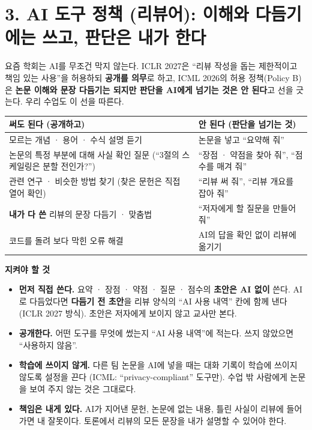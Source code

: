 \documentclass[11pt]{article}
\begin{document}
\section*{3. AI 도구 정책 (리뷰어): 이해와 다듬기에는 쓰고, 판단은 내가 한다}
요즘 학회는 AI를 무조건 막지 않는다. ICLR 2027은 ``리뷰 작성을 돕는 제한적이고 책임 있는 사용''을 허용하되 \textbf{공개를 의무}로 하고, ICML 2026의 허용 정책(Policy B)은 \textbf{논문 이해와 문장 다듬기는 되지만 판단을 AI에게 넘기는 것은 안 된다}고 선을 긋는다. 우리 수업도 이 선을 따른다.

\begin{center}
\small
\begin{tabular}{@{}p{6.6cm}p{6.6cm}@{}}
\toprule
\textbf{써도 된다 (공개하고)} & \textbf{안 된다 (판단을 넘기는 것)} \\
\midrule
모르는 개념 · 용어 · 수식 설명 듣기 & 논문을 넣고 ``요약해 줘'' \\
논문의 특정 부분에 대해 사실 확인 질문 (``3절의 스케일링은 분할 전인가?'') & ``장점 · 약점을 찾아 줘'', ``점수를 매겨 줘'' \\
관련 연구 · 비슷한 방법 찾기 (찾은 문헌은 직접 열어 확인) & ``리뷰 써 줘'', ``리뷰 개요를 잡아 줘'' \\
\textbf{내가 다 쓴} 리뷰의 문장 다듬기 · 맞춤법 & ``저자에게 할 질문을 만들어 줘'' \\
코드를 돌려 보다 막힌 오류 해결 & AI의 답을 확인 없이 리뷰에 옮기기 \\
\bottomrule
\end{tabular}
\end{center}

\noindent\textbf{지켜야 할 것}
\begin{itemize}
\item \textbf{먼저 직접 쓴다.} 요약 · 장점 · 약점 · 질문 · 점수의 \textbf{초안은 AI 없이} 쓴다. AI로 다듬었다면 \textbf{다듬기 전 초안}을 리뷰 양식의 ``AI 사용 내역'' 칸에 함께 낸다 (ICLR 2027 방식). 초안은 저자에게 보이지 않고 교사만 본다.
\item \textbf{공개한다.} 어떤 도구를 무엇에 썼는지 ``AI 사용 내역''에 적는다. 쓰지 않았으면 ``사용하지 않음''.
\item \textbf{학습에 쓰이지 않게.} 다른 팀 논문을 AI에 넣을 때는 대화 기록이 학습에 쓰이지 않도록 설정을 끈다 (ICML: ``privacy-compliant'' 도구만). 수업 밖 사람에게 논문을 보여 주지 않는 것은 그대로다.
\item \textbf{책임은 내게 있다.} AI가 지어낸 문헌, 논문에 없는 내용, 틀린 사실이 리뷰에 들어가면 내 잘못이다. 토론에서 리뷰의 모든 문장을 내가 설명할 수 있어야 한다.
\end{itemize}
\end{document}
